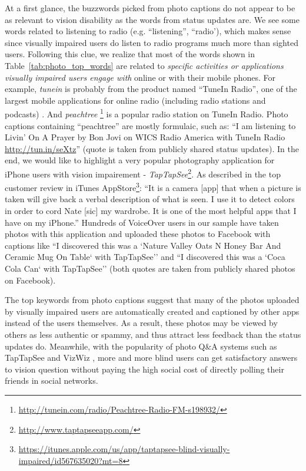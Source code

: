 \documentclass{sigchi}
\begin{document}
At a first glance, the buzzwords picked from photo captions do not appear to be as relevant to vision disability as the words from status updates are. We see some words related to listening to radio (e.g. ``listening'', ``radio'), which makes sense since visually impaired users do listen to radio programs much more than sighted users. Following this clue, we realize that most of the words shown in Table~\ref{tab:photo_top_words} are related to \emph{specific activities or applications visually impaired users engage with} online or with their mobile phones. For example, \textit{tunein} is probably from the product named ``TuneIn Radio'', one of the largest mobile applications for online radio (including radio stations and podcasts) \cite{tunein_wiki}. And \textit{peachtree} \footnote{\url{http://tunein.com/radio/Peachtree-Radio-FM-s198932/}} is a popular radio station on TuneIn Radio. Photo captions containing ``peachtree'' are mostly formulaic, such as: ``I am listening to Livin' On A Prayer by Bon Jovi on WICS Radio America with TuneIn Radio \url{http://tun.in/seXtz}'' (quote is taken from publicly shared status updates). In the end, we would like to highlight a very popular photography application for iPhone users with vision impairement - \textit{TapTapSee}\footnote{\url{http://www.taptapseeapp.com/}}. As described in the top customer review in iTunes AppStore\footnote{\url{https://itunes.apple.com/us/app/taptapsee-blind-visually-impaired/id567635020?mt=8}}: ``It is a camera [app] that when a picture is taken will give back a verbal description of what is seen. I use it to detect colors in order to cord Nate [sic] my wardrobe. It is one of the most helpful apps that I have on my iPhone.'' Hundreds of VoiceOver users in our sample have taken photos with this application and uploaded these photos to Facebook with captions like ``I discovered this was a `Nature Valley Oats N Honey Bar And Ceramic Mug On Table` with TapTapSee'' and ``I discovered this was a `Coca Cola Can` with TapTapSee'' (both quotes are taken from publicly shared photos on Facebook). 

The top keywords from photo captions suggest that many of the photos uploaded by visually impaired users are automatically created and captioned by other apps instead of the users themselves. As a result, these photos may be viewed by others as less authentic or spammy, and thus attract less feedback than the status updates do. Meanwhile, with the popularity of photo Q\&A systems such as TapTapSee and VizWiz \cite{jayant2011}, more and more blind users can get satisfactory answers to vision question without paying the high social cost of directly polling their friends in social networks\cite{brady2013cscw}. 
\end{document}
